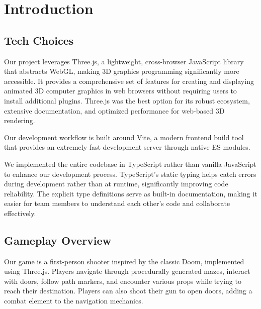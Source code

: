 \documentclass{article}
\begin{document}
\section{Introduction}\label{sec:introduction}
\subsection{Tech Choices}
Our project leverages Three.js, a lightweight, cross-browser JavaScript library that abstracts WebGL, making 3D graphics programming significantly more accessible. It provides a comprehensive set of features for creating and displaying animated 3D computer graphics in web browsers without requiring users to install additional plugins. Three.js was the best option for its robust ecosystem, extensive documentation, and optimized performance for web-based 3D rendering.

Our development workflow is built around Vite, a modern frontend build tool that provides an extremely fast development server through native ES modules.

We implemented the entire codebase in TypeScript rather than vanilla JavaScript to enhance our development process. TypeScript's static typing helps catch errors during development rather than at runtime, significantly improving code reliability. The explicit type definitions serve as built-in documentation, making it easier for team members to understand each other's code and collaborate effectively.

\subsection{Gameplay Overview}
Our game is a first-person shooter inspired by the classic Doom, implemented using Three.js. Players navigate through procedurally generated mazes, interact with doors, follow path markers, and encounter various props while trying to reach their destination. Players can also shoot their gun to open doors, adding a combat element to the navigation mechanics.
\end{document}
